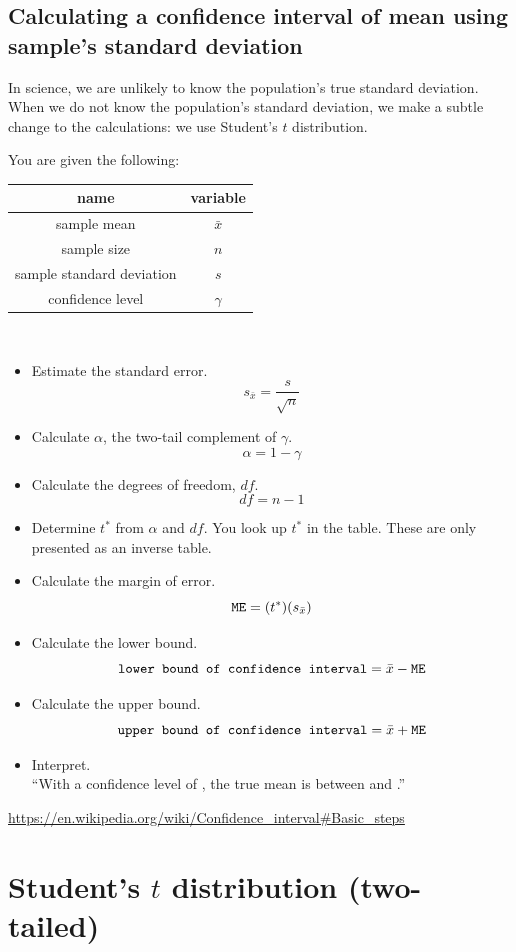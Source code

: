 \documentclass[12pt,letterpaper]{article}
\begin{document}
\newpage
\subsection*{Calculating a confidence interval of mean using sample's standard deviation}
In science, we are unlikely to know the population's true standard deviation. When we do not know the population's standard deviation, we make a subtle change to the calculations: we use Student's $t$ distribution.

You are given the following:

\begin{tabular}{|c|c|}\hline
name & variable  \\ \hline
sample mean & $\bar{x}$  \\
sample size & $n$ \\
sample standard deviation & $s$ \\
confidence level & $\gamma$ \\ \hline
\end{tabular}\\
\begin{itemize}
\item Estimate the standard error.
$$s_{\bar{x}} = \frac{s}{\sqrt{n}} $$
\item Calculate $\alpha$, the two-tail complement of $\gamma$.
$$\alpha = 1-\gamma $$
\item Calculate the degrees of freedom, $df$.
$$df = n-1$$
\item Determine $t^*$ from $\alpha$ and $df$. You look up $t^*$ in the table. These are only presented as an inverse table.


\item Calculate the margin of error.
$$\mathtt{ME} = (t^*)(s_{\bar{x}}) $$

\item Calculate the lower bound.
$$\texttt{lower bound of confidence interval} = \bar{x}-\mathtt{ME} $$
\item Calculate the upper bound.
$$\texttt{upper bound of confidence interval} = \bar{x}+\mathtt{ME} $$
\item Interpret.\\
``With a confidence level of \fbox{\phantom{H} $\gamma$ \phantom{H}}, the true mean is between  and .''
\end{itemize}
\url{https://en.wikipedia.org/wiki/Confidence_interval#Basic_steps}
\newpage

\section{Student's $t$ distribution (two-tailed)}
\end{document}
